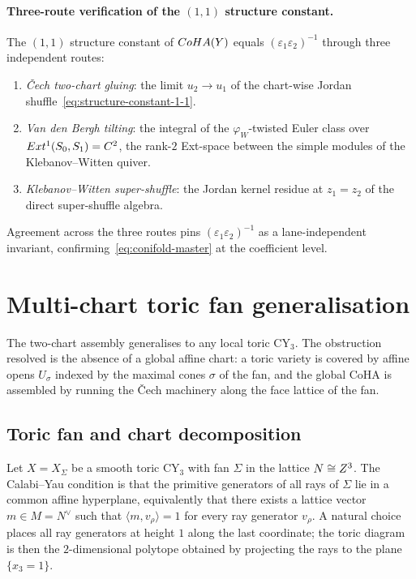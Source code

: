 \paragraph{Three-route verification of the $(1,1)$ structure constant.}
The $(1,1)$ structure constant of $CoHA(Y)$ equals $(\varepsilon_1
\varepsilon_2)^{-1}$ through three independent routes:
\begin{enumerate}[label=\emph{(\roman*)}, leftmargin=2em]
\item \emph{\v{C}ech two-chart gluing}: the limit $u_2 \to u_1$ of the
  chart-wise Jordan shuffle~\eqref{eq:structure-constant-1-1}.
\item \emph{Van den Bergh tilting}: the integral of the $\varphi_W$-twisted
  Euler class over $Ext^1(S_0, S_1) = C^2$, the rank-$2$
  Ext-space between the simple modules of the Klebanov--Witten quiver.
\item \emph{Klebanov--Witten super-shuffle}: the Jordan kernel residue at
  $z_1 = z_2$ of the direct super-shuffle algebra.
\end{enumerate}
Agreement across the three routes pins $(\varepsilon_1 \varepsilon_2)^{-1}$
as a lane-independent invariant, confirming~\eqref{eq:conifold-master} at
the coefficient level.

\section{Multi-chart toric fan generalisation}
\label{sec:gluing-p2-multi-chart}

The two-chart assembly generalises to any local toric CY$_3$.  The obstruction
resolved is the absence of a global affine chart: a toric variety is covered
by affine opens $U_\sigma$ indexed by the maximal cones $\sigma$ of the fan,
and the global CoHA is assembled by running the \v{C}ech machinery along the
face lattice of the fan.

\subsection{Toric fan and chart decomposition}

Let $X = X_\Sigma$ be a smooth toric CY$_3$ with fan $\Sigma$ in the lattice
$N \cong Z^3$.  The Calabi--Yau condition is that the primitive generators
of all rays of $\Sigma$ lie in a common affine hyperplane, equivalently
that there exists a lattice vector $m \in M = N^\vee$ such that
$\langle m, v_\rho \rangle = 1$ for every ray generator $v_\rho$.  A
natural choice places all ray generators at height $1$ along the
last coordinate; the toric diagram is then the $2$-dimensional polytope
obtained by projecting the rays to the plane $\{x_3 = 1\}$.

